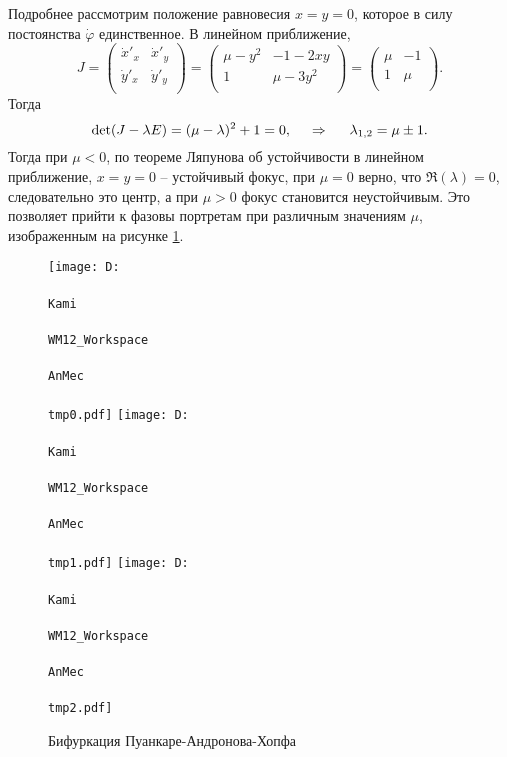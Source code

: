 Подробнее рассмотрим положение равновесия $x=y=0$, которое в силу постоянства $\dot{\varphi}$ единственное. В линейном приближение, 
\begin{equation*}
    J = \begin{pmatrix}
        \dot{x}'_x & \dot{x}'_y \\
        \dot{y}'_x & \dot{y}'_y \\
    \end{pmatrix}
    = 
    \begin{pmatrix}
        \mu-y^2 & -1-2xy \\
        1 & \mu - 3 y^2 \\
    \end{pmatrix} = \begin{pmatrix}
        \mu & -1 \\
        1 & \mu \\
    \end{pmatrix}.
\end{equation*}
Тогда 
\begin{equation*}
    \det(J - \lambda E) = (\mu - \lambda)^2 + 1 = 0,
    \hspace{0.5cm} \Rightarrow \hspace{0.5cm}
    \lambda_{1, 2} = \mu \pm 1.
\end{equation*}
Тогда при $\mu < 0$, по теореме Ляпунова об устойчивости в линейном приближение, $x=y=0$ -- устойчивый фокус, при $\mu = 0$ верно, что $\Re (\lambda) = 0$, следовательно это центр, а при $\mu > 0$ фокус становится неустойчивым. Это позволяет прийти к фазовы портретам при различным значениям $\mu$, изображенным на рисунке \ref{T6}.

\begin{figure}[ht]
    \centering
    \texttt{[image: D:\\\\Kami\\\\WM12\_Workspace\\\\AnMec\\\\tmp0.pdf]}
    \hspace{0.2cm}
    \texttt{[image: D:\\\\Kami\\\\WM12\_Workspace\\\\AnMec\\\\tmp1.pdf]}
    \hspace{0.2cm}
    \texttt{[image: D:\\\\Kami\\\\WM12\_Workspace\\\\AnMec\\\\tmp2.pdf]}
    \caption{Бифуркация Пуанкаре-Андронова-Хопфа}
    \label{T6}
\end{figure}
